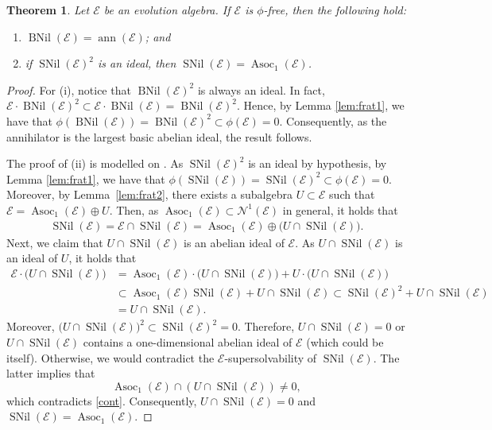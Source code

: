 \documentclass[12pt,reqno]{amsart}
\newtheorem{theorem}{Theorem}[section]
\theoremstyle{definition}
\theoremstyle{remark}
\DeclareMathOperator{\ann}{ann}
\DeclareMathOperator{\asoc}{Asoc}
\DeclareMathOperator{\bnil}{BNil}
\DeclareMathOperator{\snil}{SNil}
\numberwithin{equation}{section}
\begin{document}
\begin{theorem}\label{th:phi-free1}
	Let $\mathcal{E}$ be an evolution algebra. If $\mathcal{E}$ is $\phi$-free, then the following hold:
	\begin{enumerate}[\rm (i)]
		\item $\bnil(\mathcal{E})=\ann(\mathcal{E})$; and
		\item if $\snil(\mathcal{E})^2$ is an ideal, then $\snil(\mathcal{E})=\asoc_1(\mathcal{E})$. 
	\end{enumerate}
\end{theorem}
\begin{proof}
	For (i), notice that $\bnil(\mathcal{E})^2$ is always an ideal. In fact, $\mathcal{E}\cdot\bnil(\mathcal{E})^2\subset\mathcal{E}\cdot\bnil(\mathcal{E})=\bnil(\mathcal{E})^2$. 
	Hence, by Lemma \ref{lem:frat1}, we have that $\phi(\bnil(\mathcal{E}))=\bnil(\mathcal{E})^2\subset\phi(\mathcal{E})=0$. Consequently,  as the annihilator is the largest basic abelian ideal, the result follows.
	
	The proof of (ii) is modelled on \cite[Theorem 7.4]{frat_towers}. As $\snil(\mathcal{E})^2$ is an ideal by hypothesis, by Lemma \ref{lem:frat1}, we have that $\phi(\snil(\mathcal{E}))=\snil(\mathcal{E})^2\subset\phi(\mathcal{E})=0$. Moreover, by Lemma~\ref{lem:frat2}, there exists a subalgebra $U\subset\mathcal{E}$ such that $\mathcal{E}=\asoc_1(\mathcal{E})\oplus U$. Then, as $\asoc_1(\mathcal{E})\subset\mathcal{N}^1(\mathcal{E})$ in general, it holds that
	\begin{align}\label{cont}
		\snil(\mathcal{E})=\mathcal{E}\cap\snil(\mathcal{E})=\asoc_1(\mathcal{E})\oplus\big(U\cap\snil(\mathcal{E})\big).
	\end{align}
	Next, we claim that $U\cap\snil(\mathcal{E})$ is an abelian ideal of $\mathcal{E}$. As $U\cap\snil(\mathcal{E})$ is an ideal of $U$, it holds that
	\begin{align*}
		\mathcal{E}\cdot\big(U\cap\snil(\mathcal{E})\big)&=\asoc_1(\mathcal{E})\cdot\big(U\cap\snil(\mathcal{E})\big)+U\cdot\big(U\cap\snil(\mathcal{E})\big)\\
		&\subset\asoc_1(\mathcal{E})\snil(\mathcal{E})+U\cap\snil(\mathcal{E})\subset\snil(\mathcal{E})^2+U\cap\snil(\mathcal{E})\\
		&=U\cap\snil(\mathcal{E}).
	\end{align*}
	Moreover, $\big(U\cap\snil(\mathcal{E})\big)^2\subset\snil(\mathcal{E})^2=0$. Therefore, $U\cap\snil(\mathcal{E})=0$ or $U\cap\snil(\mathcal{E})$ contains a one-dimensional abelian ideal of $\mathcal{E}$ (which could be itself). Otherwise, we would contradict the $\mathcal{E}$-supersolvability of $\snil(\mathcal{E})$. The latter implies that
	\[\asoc_1(\mathcal{E})\cap(U\cap\snil(\mathcal{E}))\neq0,\]
	which contradicts \eqref{cont}. Consequently, $U\cap\snil(\mathcal{E})=0$ and $\snil(\mathcal{E})=\asoc_1(\mathcal{E})$.
\end{proof}
\end{document}
